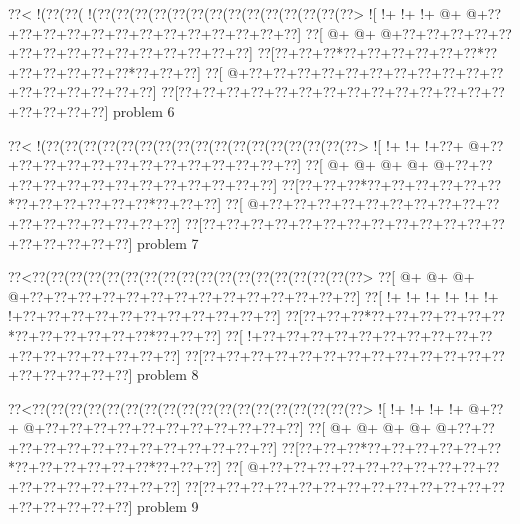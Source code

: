 \vbox{\vbox{\goo
\0??<\- !(\0??(\0??(\- !(\0??(\0??(\0??(\0??(\0??(\0??(\0??(\0??(\0??(\0??(\0??(\0??(\0??(\0??>
\- ![\- !+\- !+\- !+\- @+\- @+\0??+\0??+\0??+\0??+\0??+\0??+\0??+\0??+\0??+\0??+\0??+\0??+\0??]
\0??[\- @+\- @+\- @+\0??+\0??+\0??+\0??+\0??+\0??+\0??+\0??+\0??+\0??+\0??+\0??+\0??+\0??+\0??]
\0??[\0??+\0??+\0??*\0??+\0??+\0??+\0??+\0??+\0??*\0??+\0??+\0??+\0??+\0??+\0??*\0??+\0??+\0??]
\0??[\- @+\0??+\0??+\0??+\0??+\0??+\0??+\0??+\0??+\0??+\0??+\0??+\0??+\0??+\0??+\0??+\0??+\0??]
\0??[\0??+\0??+\0??+\0??+\0??+\0??+\0??+\0??+\0??+\0??+\0??+\0??+\0??+\0??+\0??+\0??+\0??+\0??]
}
\hfil problem 6\hfil\break
}



\vbox{\vbox{\goo
\0??<\- !(\0??(\0??(\0??(\0??(\0??(\0??(\0??(\0??(\0??(\0??(\0??(\0??(\0??(\0??(\0??(\0??(\0??>
\- ![\- !+\- !+\- !+\0??+\- @+\0??+\0??+\0??+\0??+\0??+\0??+\0??+\0??+\0??+\0??+\0??+\0??+\0??]
\0??[\- @+\- @+\- @+\- @+\- @+\0??+\0??+\0??+\0??+\0??+\0??+\0??+\0??+\0??+\0??+\0??+\0??+\0??]
\0??[\0??+\0??+\0??*\0??+\0??+\0??+\0??+\0??+\0??*\0??+\0??+\0??+\0??+\0??+\0??*\0??+\0??+\0??]
\0??[\- @+\0??+\0??+\0??+\0??+\0??+\0??+\0??+\0??+\0??+\0??+\0??+\0??+\0??+\0??+\0??+\0??+\0??]
\0??[\0??+\0??+\0??+\0??+\0??+\0??+\0??+\0??+\0??+\0??+\0??+\0??+\0??+\0??+\0??+\0??+\0??+\0??]
}
\hfil problem 7\hfil\break
}



\vbox{\vbox{\goo
\0??<\0??(\0??(\0??(\0??(\0??(\0??(\0??(\0??(\0??(\0??(\0??(\0??(\0??(\0??(\0??(\0??(\0??(\0??>
\0??[\- @+\- @+\- @+\- @+\0??+\0??+\0??+\0??+\0??+\0??+\0??+\0??+\0??+\0??+\0??+\0??+\0??+\0??]
\0??[\- !+\- !+\- !+\- !+\- !+\- !+\- !+\0??+\0??+\0??+\0??+\0??+\0??+\0??+\0??+\0??+\0??+\0??]
\0??[\0??+\0??+\0??*\0??+\0??+\0??+\0??+\0??+\0??*\0??+\0??+\0??+\0??+\0??+\0??*\0??+\0??+\0??]
\0??[\- !+\0??+\0??+\0??+\0??+\0??+\0??+\0??+\0??+\0??+\0??+\0??+\0??+\0??+\0??+\0??+\0??+\0??]
\0??[\0??+\0??+\0??+\0??+\0??+\0??+\0??+\0??+\0??+\0??+\0??+\0??+\0??+\0??+\0??+\0??+\0??+\0??]
}
\hfil problem 8\hfil\break
}



\vbox{\vbox{\goo
\0??<\0??(\0??(\0??(\0??(\0??(\0??(\0??(\0??(\0??(\0??(\0??(\0??(\0??(\0??(\0??(\0??(\0??(\0??>
\- ![\- !+\- !+\- !+\- !+\- @+\0??+\- @+\0??+\0??+\0??+\0??+\0??+\0??+\0??+\0??+\0??+\0??+\0??]
\0??[\- @+\- @+\- @+\- @+\- @+\0??+\0??+\0??+\0??+\0??+\0??+\0??+\0??+\0??+\0??+\0??+\0??+\0??]
\0??[\0??+\0??+\0??*\0??+\0??+\0??+\0??+\0??+\0??*\0??+\0??+\0??+\0??+\0??+\0??*\0??+\0??+\0??]
\0??[\- @+\0??+\0??+\0??+\0??+\0??+\0??+\0??+\0??+\0??+\0??+\0??+\0??+\0??+\0??+\0??+\0??+\0??]
\0??[\0??+\0??+\0??+\0??+\0??+\0??+\0??+\0??+\0??+\0??+\0??+\0??+\0??+\0??+\0??+\0??+\0??+\0??]
}
\hfil problem 9\hfil\break
}



